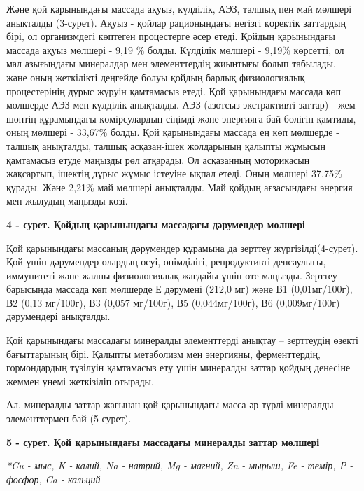 Және қой қарынындағы массада ақуыз, күлділік, АЭЗ, талшық пен май
мөлшері анықталды (3-сурет). Ақуыз - қойлар рационындағы негізгі
қоректік заттардың бірі, ол организмдегі көптеген процестерге әсер
етеді. Қойдың қарынындағы массада ақуыз мөлшері - 9,19 \% болды.
Күлділік мөлшері - 9,19\% көрсетті, ол мал азығындағы минералдар мен
элементтердің жиынтығы болып табылады, және оның жеткілікті деңгейде
болуы қойдың барлық физиологиялық процестерінің дұрыс жүруін қамтамасыз
етеді. Қой қарынындағы массада көп мөлшерде АЭЗ мен күлділік анықталды.
АЭЗ (азотсыз экстрактивті заттар) - жем-шөптің құрамындағы көмірсулардың
сіңімді және энергияға бай бөлігін қамтиды, оның мөлшері - 33,67\%
болды. Қой қарынындағы массада ең көп мөлшерде - талшық анықталды,
талшық асқазан-ішек жолдарының қалыпты жұмысын қамтамасыз етуде маңызды
рөл атқарады. Ол асқазанның моторикасын жақсартып, ішектің дұрыс жұмыс
істеуіне ықпал етеді. Оның мөлшері 37,75\% құрады. Және 2,21\% май
мөлшері анықталды. Май қойдың ағзасындағы энергия мен жылудың маңызды
көзі.

{\bfseries 4 - сурет. Қойдың қарынындағы массадағы дәрумендер мөлшері}

Қой қарынындағы массаның дәрумендер құрамына да зерттеу
жүргізілді(4-сурет). Қой үшін дәрумендер олардың өсуі, өнімділігі,
репродуктивті денсаулығы, иммунитеті және жалпы физиологиялық жағдайы
үшін өте маңызды. Зерттеу барысында массада көп мөлшерде Е дәрумені
(212,0 мг) және В1 (0,01мг/100г), В2 (0,13 мг/100г), В3 (0,057 мг/100г),
В5 (0,044мг/100г), В6 (0,009мг/100г) дәрумендері анықталды.

Қой қарынындағы массадағы минералды элементтерді анықтау -- зерттеудің
өзекті бағыттарының бірі. Қалыпты метаболизм мен энергияны,
ферменттердің, гормондардың түзілуін қамтамасыз ету үшін минералды
заттар қойдың денесіне жеммен үнемі жеткізіліп отырады.

Ал, минералды заттар жағынан қой қарынындағы масса әр түрлі минералды
элементтермен бай (5-сурет).

{\bfseries 5 - сурет. Қой қарынындағы массадағы минералды заттар мөлшері}

\emph{*Cu - мыс, K - калий, Na - натрий, Mg - магний, Zn - мырыш, Fe -
темір, P - фосфор, Ca - кальций}

